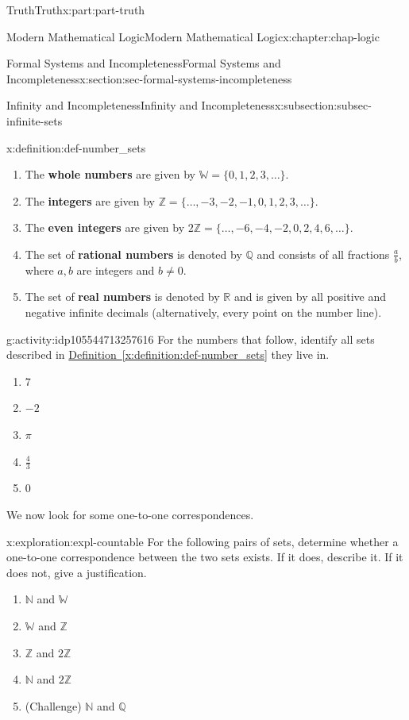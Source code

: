 \documentclass[oneside,10pt,]{book}
\newcommand{\xreffont}{\relax}
\newcommand{\terminology}[1]{\textbf{#1}}
\numberwithin{equation}{section}
\begin{document}
\begin{partptx}{Truth}{}{Truth}{}{}{x:part:part-truth}
\begin{chapterptx}{Modern Mathematical Logic}{}{Modern Mathematical Logic}{}{}{x:chapter:chap-logic}
\begin{sectionptx}{Formal Systems and Incompleteness}{}{Formal Systems and Incompleteness}{}{}{x:section:sec-formal-systems-incompleteness}
\begin{subsectionptx}{Infinity and Incompleteness}{}{Infinity and Incompleteness}{}{}{x:subsection:subsec-infinite-sets}
\begin{definition}{}{x:definition:def-number_sets}
\begin{enumerate}
\item{}The \terminology{whole numbers} are given by \(\mathbb{W} = \{0,1,2,3,\ldots\}\).%
\item{}The \terminology{integers} are given by \(\mathbb{Z} = \{\ldots, -3, -2, -1, 0, 1, 2, 3, \ldots\}\).%
\item{}The \terminology{even integers} are given by \(2\mathbb{Z} = \{\ldots, -6, -4, -2, 0, 2, 4, 6, \ldots\}\).%
\item{}The set of \terminology{rational numbers} is denoted by \(\mathbb{Q}\) and consists of all fractions \(\frac{a}{b}\), where \(a,b\) are integers and \(b\ne 0\).%
\item{}The set of \terminology{real numbers} is denoted by \(\mathbb{R}\) and is given by all positive and negative infinite decimals (alternatively, every point on the number line).%
\end{enumerate}
\end{definition}
\begin{activity}{}{g:activity:idp105544713257616}%
For the numbers that follow, identify all sets described in \hyperref[x:definition:def-number_sets]{Definition~{\xreffont\ref{x:definition:def-number_sets}}} they live in.%
%
\begin{enumerate}
\item{}\(\displaystyle 7\)%
\item{}\(\displaystyle -2\)%
\item{}\(\displaystyle \pi\)%
\item{}\(\displaystyle \frac{4}{3}\)%
\item{}\(\displaystyle 0\)%
\end{enumerate}
\end{activity}%
We now look for some one-to-one correspondences.%
\begin{exploration}{}{x:exploration:expl-countable}%
For the following pairs of sets, determine whether a one-to-one correspondence between the two sets exists. If it does, describe it. If it does not, give a justification.%
%
\begin{enumerate}
\item{}\(\mathbb{N}\) and \(\mathbb{W}\)%
\item{}\(\mathbb{W}\) and \(\mathbb{Z}\)%
\item{}\(\mathbb{Z}\) and \(2\mathbb{Z}\)%
\item{}\(\mathbb{N}\) and \(2\mathbb{Z}\)%
\item{}(Challenge) \(\mathbb{N}\) and \(\mathbb{Q}\)%
\end{enumerate}

\end{exploration}
\end{subsectionptx}
\end{sectionptx}
\end{chapterptx}
\end{partptx}
\end{document}
